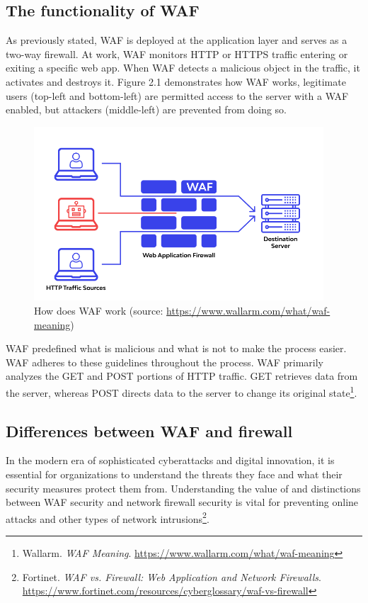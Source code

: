 \subsection{The functionality of WAF}
\label{subsec:waf_work}
\hspace{0.5cm}As previously stated, WAF is deployed at the application layer and serves as a two-way firewall. At work, WAF monitors HTTP or HTTPS traffic entering or exiting a specific web app. When WAF detects a malicious object in the traffic, it activates and destroys it. Figure 2.1 demonstrates how WAF works, legitimate users (top-left and bottom-left) are permitted access to the server with a WAF enabled, but attackers (middle-left) are prevented from doing so.
\begin{figure}[ht]
   
	\centering
	\includegraphics[width=\linewidth, height=6.5cm,keepaspectratio]{figures/wallarmwaf.png}
	\caption{How does WAF work (source: \url{https://www.wallarm.com/what/waf-meaning})}\label{Fig:Data1}
  
\end{figure} 

\newpage
WAF predefined what is malicious and what is not to make the process easier. WAF adheres to these guidelines throughout the process. WAF primarily analyzes the GET and POST portions of HTTP traffic. GET retrieves data from the server, whereas POST directs data to the server to change its original state\footnote{Wallarm. \textit{WAF Meaning}. \url{https://www.wallarm.com/what/waf-meaning}}.



\subsection{Differences between WAF and firewall}
\label{subsec:versus}
\hspace{0.5cm}In the modern era of sophisticated cyberattacks and digital innovation, it is essential for organizations to understand the threats they face and what their security measures protect them from. Understanding the value of and distinctions between WAF security and network firewall security is vital for preventing online attacks and other types of network intrusions\footnote{Fortinet. \textit{WAF vs. Firewall: Web Application and Network Firewalls}. 
\url{https://www.fortinet.com/resources/cyberglossary/waf-vs-firewall}}.

